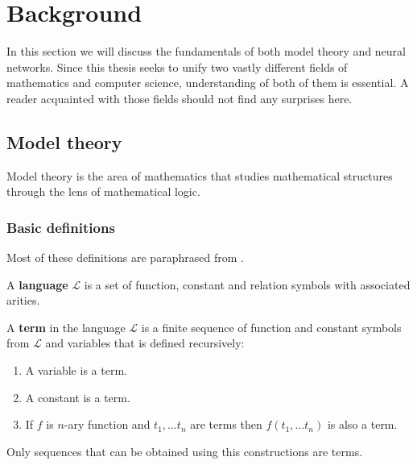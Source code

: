 \chapter{Background}
In this section we will discuss the fundamentals of both model theory and neural networks. Since this thesis seeks to unify two vastly different fields of mathematics and computer science, understanding of both of them is essential. A reader acquainted with those fields should not find any surprises here.


\section{Model theory}
Model theory is the area of mathematics that studies mathematical structures through the lens of mathematical logic.
\subsection{Basic definitions}
Most of these definitions are paraphrased from \cite{model}.
\begin{defn} A \textbf{language} $\mathcal{L}$ is a set of function, constant and relation symbols with associated arities.
\end{defn}

\begin{defn} A \textbf{term} in the language $\mathcal{L}$ is a finite sequence of function and constant symbols from $\mathcal{L}$ and variables that is defined recursively:
	\begin{enumerate}
	\item A variable is a term.
	\item A constant is a term.
	\item If $f$ is $n$-ary function and $t_1, \dots t_n$ are terms then $f(t_1, \dots t_n)$ is also a term.
	\end{enumerate}
Only sequences that can be obtained using this constructions are terms.
\end{defn}

